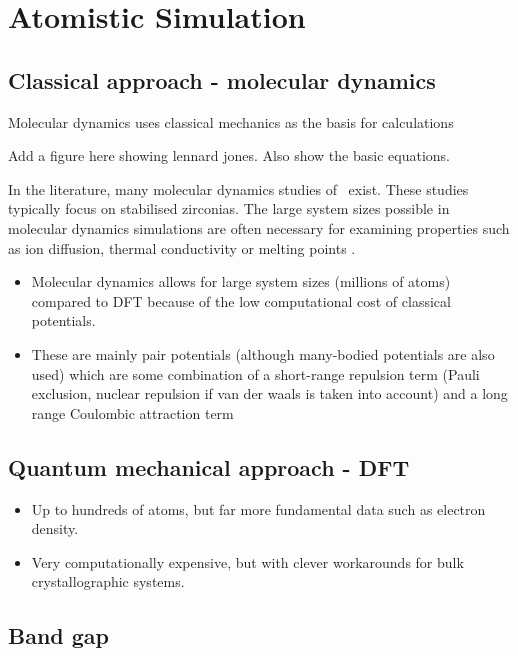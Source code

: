 \section{Atomistic Simulation}

\subsection{Classical approach - molecular dynamics}

Molecular dynamics uses classical mechanics as the basis for calculations 

Add a figure here showing lennard jones. Also show the basic equations.

In the literature, many molecular dynamics studies of \zirconia\ exist. These studies typically focus on stabilised zirconias. The large system sizes possible in molecular dynamics simulations are often necessary for examining properties such as ion diffusion, thermal conductivity or melting points \cite{Davis2010}.

\begin{itemize}
\item Molecular dynamics allows for large system sizes (millions of atoms) compared to DFT because of the low computational cost of classical potentials. 
\item These are mainly pair potentials (although many-bodied potentials are also used) which are some combination of a short-range repulsion term (Pauli exclusion, nuclear repulsion if van der waals is taken into account) and a long range Coulombic attraction term
\end{itemize}

\subsection{Quantum mechanical approach - DFT}

\begin{itemize}
\item Up to hundreds of atoms, but far more fundamental data such as electron density.
\item Very computationally expensive, but with clever workarounds for bulk crystallographic systems.
\end{itemize}

\subsection{Band gap}

